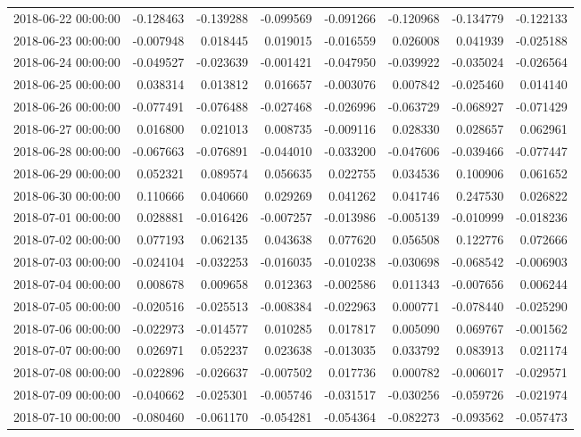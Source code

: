 \begin{tabular}{lrrrrrrr}
2018-06-22 00:00:00 & -0.128463 & -0.139288 & -0.099569 & -0.091266 & -0.120968 & -0.134779 & -0.122133 \\
2018-06-23 00:00:00 & -0.007948 & 0.018445 & 0.019015 & -0.016559 & 0.026008 & 0.041939 & -0.025188 \\
2018-06-24 00:00:00 & -0.049527 & -0.023639 & -0.001421 & -0.047950 & -0.039922 & -0.035024 & -0.026564 \\
2018-06-25 00:00:00 & 0.038314 & 0.013812 & 0.016657 & -0.003076 & 0.007842 & -0.025460 & 0.014140 \\
2018-06-26 00:00:00 & -0.077491 & -0.076488 & -0.027468 & -0.026996 & -0.063729 & -0.068927 & -0.071429 \\
2018-06-27 00:00:00 & 0.016800 & 0.021013 & 0.008735 & -0.009116 & 0.028330 & 0.028657 & 0.062961 \\
2018-06-28 00:00:00 & -0.067663 & -0.076891 & -0.044010 & -0.033200 & -0.047606 & -0.039466 & -0.077447 \\
2018-06-29 00:00:00 & 0.052321 & 0.089574 & 0.056635 & 0.022755 & 0.034536 & 0.100906 & 0.061652 \\
2018-06-30 00:00:00 & 0.110666 & 0.040660 & 0.029269 & 0.041262 & 0.041746 & 0.247530 & 0.026822 \\
2018-07-01 00:00:00 & 0.028881 & -0.016426 & -0.007257 & -0.013986 & -0.005139 & -0.010999 & -0.018236 \\
2018-07-02 00:00:00 & 0.077193 & 0.062135 & 0.043638 & 0.077620 & 0.056508 & 0.122776 & 0.072666 \\
2018-07-03 00:00:00 & -0.024104 & -0.032253 & -0.016035 & -0.010238 & -0.030698 & -0.068542 & -0.006903 \\
2018-07-04 00:00:00 & 0.008678 & 0.009658 & 0.012363 & -0.002586 & 0.011343 & -0.007656 & 0.006244 \\
2018-07-05 00:00:00 & -0.020516 & -0.025513 & -0.008384 & -0.022963 & 0.000771 & -0.078440 & -0.025290 \\
2018-07-06 00:00:00 & -0.022973 & -0.014577 & 0.010285 & 0.017817 & 0.005090 & 0.069767 & -0.001562 \\
2018-07-07 00:00:00 & 0.026971 & 0.052237 & 0.023638 & -0.013035 & 0.033792 & 0.083913 & 0.021174 \\
2018-07-08 00:00:00 & -0.022896 & -0.026637 & -0.007502 & 0.017736 & 0.000782 & -0.006017 & -0.029571 \\
2018-07-09 00:00:00 & -0.040662 & -0.025301 & -0.005746 & -0.031517 & -0.030256 & -0.059726 & -0.021974 \\
2018-07-10 00:00:00 & -0.080460 & -0.061170 & -0.054281 & -0.054364 & -0.082273 & -0.093562 & -0.057473 \\

\end{tabular}
